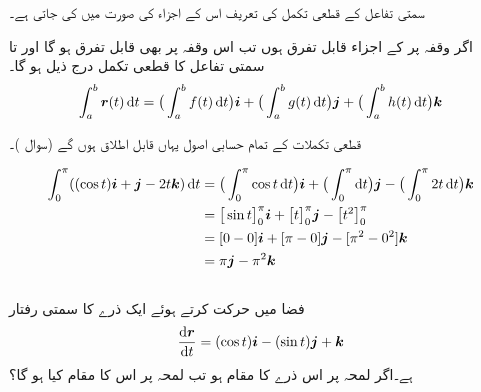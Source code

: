 سمتی تفاعل کے قطعی تکمل کی تعریف اس کے اجزاء کی صورت میں کی  جاتی ہے۔

اگر وقفہ  پر  کے اجزاء قابل تفرق ہوں تب اس وقفہ پر  بھی قابل تفرق ہو گا اور  تا   سمتی تفاعل  کا قطعی تکمل درج ذیل ہو گا۔
\begin{align*}
\int_a^b\kvec{r}(t)\dif t=\big(\int_a^b f(t)\dif t\big)\ai+\big(\int_a^b g(t)\dif t\big)\aj+\big(\int_a^b h(t)\dif t\big)\ak
\end{align*}

قطعی تکملات کے تمام حسابی  اصول یہاں قابل اطلاق ہوں گے (سوال )۔

\begin{align*}
\int_0^{\pi}((\cos t)\ai+\aj-2t\ak)\dif t&=\big(\int_0^{\pi}\cos t\dif t \big)\ai+\big(\int_0^{\pi}\dif t \big)\aj-\big(\int_0^{\pi}2t\dif t \big)\ak\\
&=\big[\sin t\big]_0^{\pi}\ai+\big[t\big]_0^{\pi}\aj-\big[t^2\big]_0^{\pi}\\
&=[0-0]\ai+[\pi-0]\aj-[\pi^2-0^2]\ak\\
&=\pi \aj-\pi^2\ak
\end{align*}
\\
فضا  میں حرکت کرتے ہوئے ایک  ذرے کا سمتی رفتار
\begin{align*}
\frac{\dif \kvec{r}}{\dif t}=(\cos t)\ai-(\sin t)\aj+\ak
\end{align*}
ہے۔اگر  لمحہ  پر اس ذرے کا مقام  ہو تب لمحہ  پر اس کا مقام کیا ہو گا؟

